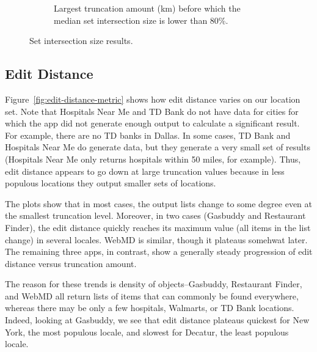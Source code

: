 \documentclass[10pt, conference, compsocconf]{IEEEtran}
\newcommand{\app}[1]{#1}
\newcommand{\hospitals}{\app{Hospitals Near Me}}
\newcommand{\tdbank}{\app{TD Bank}}
\newcommand{\webmd}{\app{WebMD}}
\newcommand{\gasbuddy}{\app{Gasbuddy}}
\newcommand{\restaurantfinder}{\app{Restaurant Finder}}
\newcommand{\walmart}{\app{Walmart}}
\begin{document}
\begin{figure}[t!]
\begin{subfigure}{\textwidth}
\begin{tabular}{|l|rrrrrr|}
\end{tabular}
 \caption{Largest truncation amount (km) before which the median set
   intersection size is lower than 80\%.}
 \label{fig:knee-points-set-cutoff}
  \end{subfigure}
  
  \caption{Set intersection size results.}
\end{figure}

\subsection{Edit Distance}

Figure~\ref{fig:edit-distance-metric} shows how edit distance 
 varies
on our location set.  
Note that Hospitals Near Me and TD Bank do
not have data for cities for which the app did not generate enough output
to calculate a significant result. 
For example, there are no TD banks in Dallas.  In some cases,
TD Bank and Hospitals Near Me do generate data, but they generate 
a very small set of results (Hospitals Near Me only returns hospitals
within 50 miles, for example).
Thus, edit distance appears to go down
at large truncation values because in less populous 
locations they output smaller sets of locations.

The plots show that in most cases, the output lists change to some
degree even at the smallest truncation level. Moreover, in two cases
(Gasbuddy and Restaurant Finder), the edit distance quickly reaches
its maximum value (all items in the list change) in several
locales. WebMD is similar, though it plateaus somehwat later. The
remaining three apps, in contrast, show a generally steady progression
of edit distance versus truncation amount.

The reason for these trends is density of objects--Gasbuddy,
Restaurant Finder, and WebMD all return lists of items that can
commonly be found everywhere, whereas there may be only a few
hospitals, Walmarts, or TD Bank locations. Indeed, looking at
Gasbuddy, we see that edit distance plateaus quickest for New York,
the most populous locale, and slowest for Decatur, the least populous
locale.

\end{document}
